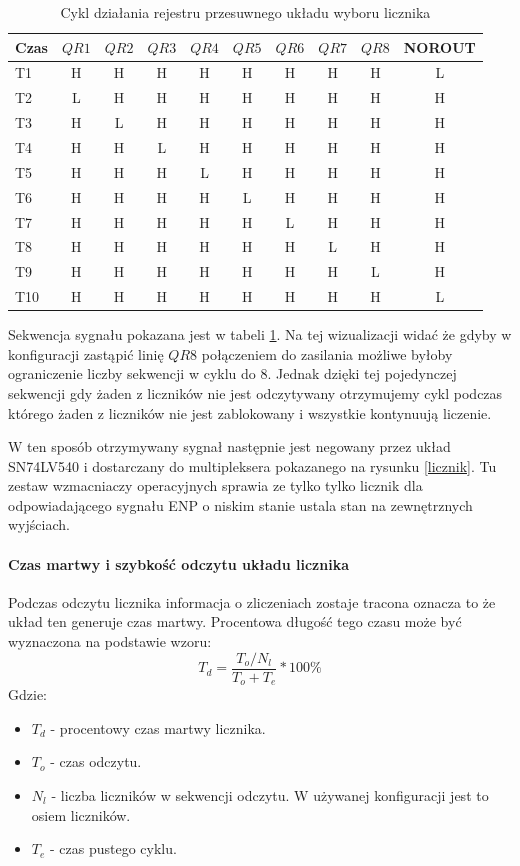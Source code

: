 \documentclass[a4paper,12pt]{article}
\begin{document}
\begin{table}
        \centering
        \caption{Cykl działania rejestru przesuwnego układu wyboru licznika}
        \label{shift sygnal}
        \begin{tabular}{lccccccccc}
                Czas &$QR1$&$QR2$&$QR3$&$QR4$&$QR5$&$QR6$&$QR7$&$QR8$  &NOROUT\\ \hline     
                T1&H&H&H&H&H&H&H&H &L\\
                T2&L&H&H&H&H&H&H&H &H\\
                T3&H&L&H&H&H&H&H&H &H\\
                T4&H&H&L&H&H&H&H&H &H\\
                T5&H&H&H&L&H&H&H&H &H\\
                T6&H&H&H&H&L&H&H&H &H\\
                T7&H&H&H&H&H&L&H&H &H\\
                T8&H&H&H&H&H&H&L&H &H\\
                T9&H&H&H&H&H&H&H&L &H\\
                T10&H&H&H&H&H&H&H&H &L\\
        \end{tabular}
\end{table}

Sekwencja sygnału pokazana jest w tabeli \ref{shift sygnal}. Na tej wizualizacji widać że gdyby w konfiguracji zastąpić linię $QR8$ połączeniem do zasilania możliwe byłoby ograniczenie liczby sekwencji w cyklu do 8. Jednak dzięki tej pojedynczej sekwencji gdy żaden z liczników nie jest odczytywany otrzymujemy cykl podczas którego żaden z liczników nie jest zablokowany i wszystkie kontynuują liczenie. 

W ten sposób otrzymywany sygnał następnie jest negowany przez układ SN74LV540 i dostarczany do multipleksera pokazanego na rysunku \ref{licznik}.
Tu zestaw wzmacniaczy operacyjnych sprawia ze tylko tylko licznik dla odpowiadającego sygnału ENP o niskim stanie ustala stan na zewnętrznych wyjściach. 

\paragraph{Czas martwy i szybkość odczytu układu licznika}
Podczas odczytu licznika informacja o zliczeniach zostaje tracona oznacza to że układ ten generuje czas martwy. 
Procentowa długość tego czasu może być wyznaczona na podstawie wzoru:
\begin{equation}
        T_d = \frac{T_o/N_l}{T_o+T_e} * 100\%
\end{equation}
Gdzie:
\begin{itemize}
        \item $T_d$ - procentowy czas martwy licznika.
        \item $T_o$ - czas odczytu.
        \item $N_l$ - liczba liczników w sekwencji odczytu. W używanej konfiguracji jest to osiem liczników. 
        \item $T_e$ - czas pustego cyklu.
\end{itemize}
\end{document}
